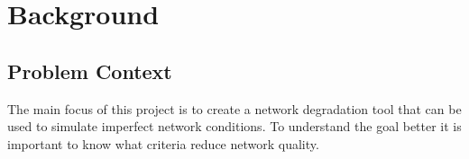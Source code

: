 

\chapter{Background}

\section{Problem Context}

The main focus of this project is to create a network degradation tool that can be used to simulate imperfect network conditions. To understand the goal better it is important to know what criteria reduce network quality.

